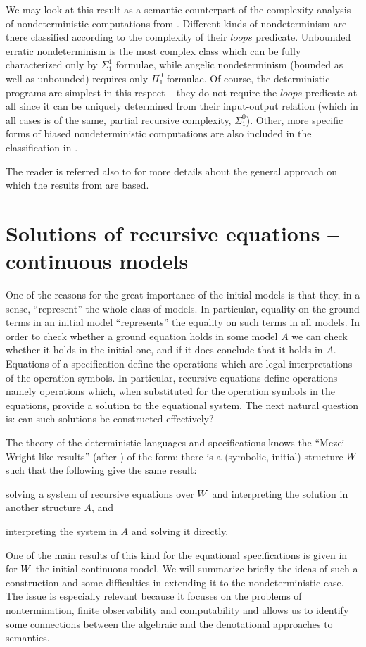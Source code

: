 {We may look at this result as a semantic counterpart of the complexity analysis of nondeterministic 
computations from \cite{c:25}. Different kinds of nondeterminism are there classified according to the 
complexity of their $loops$ predicate. Unbounded erratic nondeterminism is the most complex class which 
can be fully characterized only by $\Sigma^{1}_{1}$ formulae, while angelic nondeterminism (bounded as well as 
unbounded) requires only $\Pi^{0}_{1}$ formulae. Of course, the deterministic 
programs are simplest in this respect -- they do not require the 
$loops$ predicate at all since it can be uniquely determined from their input-output 
relation (which in all cases is of the same, partial recursive 
complexity, $\Sigma^{0}_{1}$). Other, more specific forms of 
biased nondeterministic computations are also included in the classification in \cite{c:25}.

The reader is referred also to \cite{c:19, c:20} for more details about the general approach on which the results 
from \cite{c:21} are based.

\section{Solutions of recursive equations -- continuous models}\label{se:cont}
One of the reasons for the great importance of the initial models is that they, in a sense, ``represent'' the 
whole class of models. In particular, equality on the ground terms in an initial model ``represents'' the 
equality on such terms in all models. In order to check whether a ground equation holds in some model $A$ 
we can check whether it holds in the initial one, and if it does conclude that it holds in $A$. Equations of a 
specification define the operations which are legal interpretations of the operation symbols. In particular, 
recursive equations define operations -- namely operations which, when substituted for the operation 
symbols in the equations, provide a solution to the equational system. The next natural question is: can 
such solutions be constructed effectively?

The theory of the deterministic languages and specifications knows the 
``Mezei-Wright-like results'' 
(after \cite{c:88}) of the form: there is a (symbolic, initial) structure 
$W$ such 
that the following give the same result:
\begin{enum}
\item solving a system of recursive equations over $W$ and interpreting the solution in another 
structure $A$, and
\item interpreting the system in $A$ and solving it directly.
\end{enum}
One of the main results of this kind for the equational specifications is given in \cite{c:40} 
for $W$ the initial continuous model.   
We will summarize briefly the ideas of such a construction and some difficulties in extending it to the 
nondeterministic case. The issue is especially relevant because it focuses on the problems of 
nontermination, finite observability and computability and allows us to identify some connections 
between the algebraic and the denotational approaches to semantics. 

}
